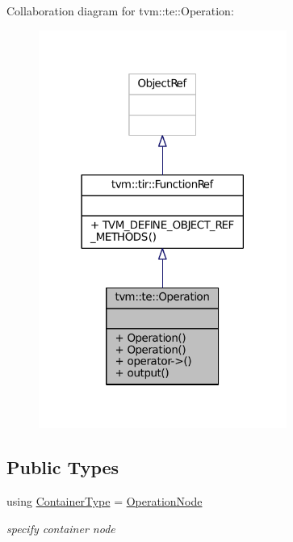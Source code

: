 Collaboration diagram for tvm\+:\+:te\+:\+:Operation\+:
\nopagebreak
\begin{figure}[H]
\begin{center}
\leavevmode
\includegraphics[width=230pt]{classtvm_1_1te_1_1Operation__coll__graph}
\end{center}
\end{figure}
\subsection*{Public Types}
\begin{DoxyCompactItemize}
\item 
using \hyperlink{classtvm_1_1te_1_1Operation_adf4101428237ffcca42774fad9ba6ef5}{Container\+Type} = \hyperlink{classtvm_1_1te_1_1OperationNode}{Operation\+Node}
\begin{DoxyCompactList}\small\item\em specify container node \end{DoxyCompactList}\end{DoxyCompactItemize}
